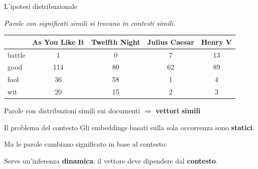 \documentclass[aspectratio=169, 10pt]{beamer}
\begin{document}
\begin{frame}{L'ipotesi distribuzionale}
    \begin{block}{}
        \centering
        \Large \textit{Parole con significati simili si trovano in contesti simili.}
    \end{block}

    \vspace{0.3cm}
    \centering
    \small
    \begin{tabular}{lcccc}
        \toprule
        & \textbf{As You Like It} & \textbf{Twelfth Night} & \textbf{Julius Caesar} & \textbf{Henry V} \\
        \midrule
        battle & 1   & 0  & 7  & 13 \\
        good   & 114 & 80 & 62 & 89 \\
        fool   & 36  & 58 & 1  & 4  \\
        wit    & 20  & 15 & 2  & 3  \\
        \bottomrule
    \end{tabular}

    \vspace{0.3cm}
    Parole con distribuzioni simili sui documenti $\Rightarrow$ \textbf{vettori simili}
\end{frame}

\begin{frame}{Il problema del contesto}
    Gli embeddings basati sulla sola occorrenza sono \textbf{statici}.

    \vspace{0.3cm}
    Ma le parole cambiano significato in base al contesto:

    \vspace{0.4cm}
    \centering

    \vspace{0.5cm}
    Serve un'inferenza \textbf{dinamica}: il vettore deve dipendere dal \textbf{contesto}.
\end{frame}
\end{document}
